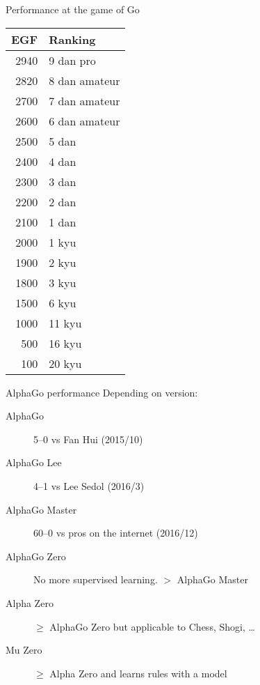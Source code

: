 \begin{frame}{Performance at the game of Go}
  \begin{minipage}[c]{0.7\linewidth}
  \end{minipage}\hfill
  \begin{minipage}[c]{0.26\linewidth}
    \begin{adjustbox}{scale=0.8}
      \begin{tabular}{| r | l |}
        \hline
        EGF & Ranking \\ \hline
        2940 & 9 dan pro \\ \hline
        2820 & 8 dan amateur \\ \hline
        2700 & 7 dan amateur \\ \hline
        2600 & 6 dan amateur \\ \hline
        2500 & 5 dan \\ \hline
        2400 & 4 dan \\ \hline
        2300 & 3 dan \\ \hline
        2200 & 2 dan \\ \hline
        2100 & 1 dan \\ \hline
        2000 & 1 kyu \\ \hline
        1900 & 2 kyu \\ \hline
        1800 & 3 kyu \\ \hline
        1500 & 6 kyu \\ \hline
        1000 & 11 kyu \\ \hline
        500 & 16 kyu \\ \hline
        100 & 20 kyu \\ \hline
      \end{tabular}
    \end{adjustbox}
  \end{minipage}\hfill
\end{frame}

\begin{frame}{AlphaGo performance}
  Depending on version:
  \begin{description}
  \item[AlphaGo] 5--0 vs Fan Hui (2015/10)
  \item[AlphaGo Lee] 4--1 vs Lee Sedol (2016/3)
  \item[AlphaGo Master] 60--0 vs pros on the internet (2016/12)
  \item[AlphaGo Zero] No more supervised learning. $>$ AlphaGo Master
  \item[Alpha Zero] $\geq$ AlphaGo Zero but applicable to Chess, Shogi, …
  \item[Mu Zero] $\geq$ Alpha Zero and learns rules with a model
  \end{description}
\end{frame}


